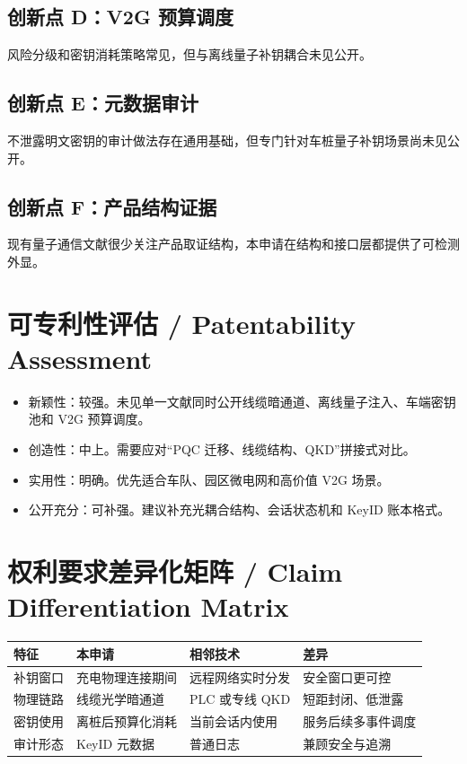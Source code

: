 ﻿\documentclass[12pt,a4paper]{article}
\begin{document}
\subsection{创新点 D：V2G 预算调度}
风险分级和密钥消耗策略常见，但与离线量子补钥耦合未见公开。

\subsection{创新点 E：元数据审计}
不泄露明文密钥的审计做法存在通用基础，但专门针对车桩量子补钥场景尚未见公开。

\subsection{创新点 F：产品结构证据}
现有量子通信文献很少关注产品取证结构，本申请在结构和接口层都提供了可检测外显。

\section{可专利性评估 / Patentability Assessment}
\begin{itemize}
\item 新颖性：较强。未见单一文献同时公开线缆暗通道、离线量子注入、车端密钥池和 V2G 预算调度。
\item 创造性：中上。需要应对“PQC 迁移、线缆结构、QKD”拼接式对比。
\item 实用性：明确。优先适合车队、园区微电网和高价值 V2G 场景。
\item 公开充分：可补强。建议补充光耦合结构、会话状态机和 KeyID 账本格式。
\end{itemize}

\section{权利要求差异化矩阵 / Claim Differentiation Matrix}
\begin{tabular}{|p{2.8cm}|p{3.8cm}|p{3.8cm}|p{2.8cm}|}
\hline
特征 & 本申请 & 相邻技术 & 差异 \\
\hline
补钥窗口 & 充电物理连接期间 & 远程网络实时分发 & 安全窗口更可控 \\
\hline
物理链路 & 线缆光学暗通道 & PLC 或专线 QKD & 短距封闭、低泄露 \\
\hline
密钥使用 & 离桩后预算化消耗 & 当前会话内使用 & 服务后续多事件调度 \\
\hline
审计形态 & KeyID 元数据 & 普通日志 & 兼顾安全与追溯 \\
\hline
\end{tabular}
\end{document}
